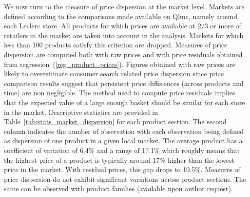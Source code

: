 \documentclass[english]{article}
\begin{document}
We now turn to the measure of price dispersion at the market level. Markets are defined according to the comparisons made available on Qlmc, namely around each Leclerc store. All products for which prices are available at 2/3 or more of retailers in the market are taken into account in the analysis. Markets for which less than 100 products satisfy this criterion are dropped. Measures of price dispersion are computed both with raw prices and with price residuals obtained from regression~(\ref{reg_product_prices}). Figures obtained with raw prices are likely to overestimate consumer search related price dispersion since price comparison results suggest that persistent price differences (across products and time) are non negligible. The method used to compute price residuals implies that the expected value of a large enough basket should be similar for each store in the market. Descriptive statistics are provided in Table~\ref{tab:stats_market_dispersion} for each product section. The second column indicates the number of observation with each observation being defined as dispersion of one product in a given local market. The average product has a coefficient of variation of 6.4\% and a range of 17.1\% which roughly means that the highest price of a product is typically around 17\% higher than the lowest price in the market. With residual prices, this gap drops to 10.5\%. Measures of price dispersion do not exhibit significant variations across product sections. The same can be observed with product families (available upon author request).
\end{document}
